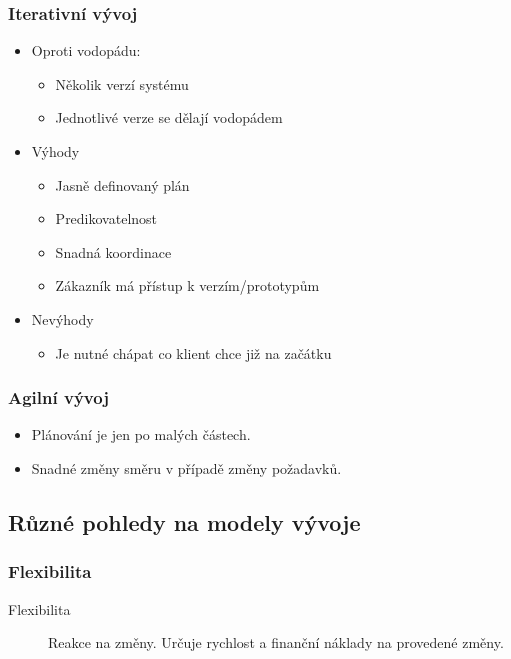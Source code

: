     \subsubsection{Iterativní vývoj}
      \begin{itemize}
        \item Oproti vodopádu:
          \begin{itemize}
            \item Několik verzí systému
            \item Jednotlivé verze se dělají vodopádem
          \end{itemize}
        \item Výhody
          \begin{itemize}
            \item Jasně definovaný plán
            \item Predikovatelnost
            \item Snadná koordinace
            \item Zákazník má přístup k verzím/prototypům
          \end{itemize}
        \item Nevýhody
          \begin{itemize}
            \item Je nutné chápat co klient chce již na začátku
          \end{itemize}
      \end{itemize}

    \subsubsection{Agilní vývoj}
      \begin{itemize}
        \item Plánování je jen po malých částech.
        \item Snadné změny směru v případě změny požadavků.
      \end{itemize}

  \subsection{Různé pohledy na modely vývoje}

    \subsubsection{Flexibilita}
      \begin{description}
        \item[Flexibilita] Reakce na změny. Určuje rychlost a finanční náklady na provedené změny.
      \end{description}

